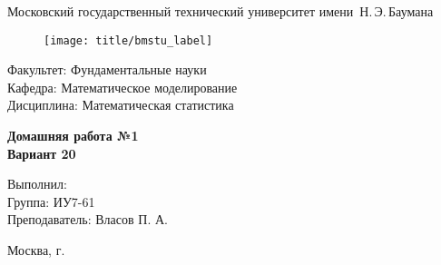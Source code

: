 
\thispagestyle{empty}

\begin{center}
	\Large
	Московский государственный технический университет имени~Н.\,Э.\,Баумана
\end{center}

\begin{figure}[h!]
	\begin{center}
		\texttt{[image: title/bmstu\_label]}
	\end{center}
\end{figure}

\hfill\begin{minipage}{0.77\textwidth}
{\large
\noindent
Факультет: Фундаментальные науки\\[2mm]
\noindent
Кафедра:  Математическое моделирование\\[2mm]
\noindent
Дисциплина: Математическая статистика 
\vspace{1.5cm}}
\end{minipage}
\vfill

\begin{center}
	\Large
	\textbf{Домашняя работа №1 \\Вариант 20}
\end{center}
\vfill

\hfill\begin{minipage}{0.6\textwidth}
	Выполнил: \\
	Группа: ИУ7-61\\
	Преподаватель: Власов П. А.
\end{minipage}
\vfill

\begin{center}
	Москва, \the\year\space г.
\end{center}